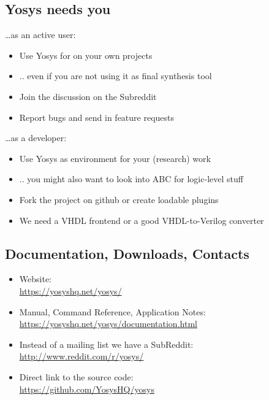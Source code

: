 
\subsection{Yosys needs you}

\begin{frame}{\subsecname}
\dots as an active user:
\begin{itemize}
\item Use Yosys for on your own projects
\item .. even if you are not using it as final synthesis tool
\item Join the discussion on the Subreddit
\item Report bugs and send in feature requests
\end{itemize}

\bigskip
\dots as a developer:
\begin{itemize}
\item Use Yosys as environment for your (research) work
\item .. you might also want to look into ABC for logic-level stuff
\item Fork the project on github or create loadable plugins
\item We need a VHDL frontend or a good VHDL-to-Verilog converter
\end{itemize}
\end{frame}


\subsection{Documentation, Downloads, Contacts}

\begin{frame}{\subsecname}
\begin{itemize}
\item Website: \\
\smallskip\hskip1cm\url{https://yosyshq.net/yosys/}

\bigskip
\item Manual, Command Reference, Application Notes: \\
\smallskip\hskip1cm\url{https://yosyshq.net/yosys/documentation.html}

\bigskip
\item Instead of a mailing list we have a SubReddit: \\
\smallskip\hskip1cm\url{http://www.reddit.com/r/yosys/}

\bigskip
\item Direct link to the source code: \\
\smallskip\hskip1cm\url{https://github.com/YosysHQ/yosys}
\end{itemize}
\end{frame}

